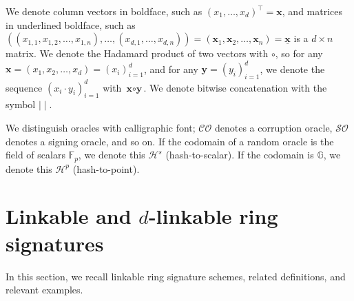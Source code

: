 \documentclass[draft]{llncs} %
\begin{document}
We denote column vectors in boldface, such as $(x_1, \ldots, x_d)^\top = \textbf{x}$, and matrices in underlined boldface, such as $((x_{1,1}, x_{1,2}, \ldots, x_{1,n}), \ldots, (x_{d,1}, \ldots, x_{d,n})) = (\textbf{x}_1, \textbf{x}_2, \ldots, \textbf{x}_n) = \underline{\textbf{x}}$ is a $d\times n$ matrix. We denote the Hadamard product of two vectors with $\circ$, so for any $\textbf{x} = (x_1, x_2, \ldots, x_d) = (x_i)_{i=1}^{d}$, and for any $\textbf{y} = (y_i)_{i=1}^{d}$, we denote the sequence $(x_i \cdot y_i)_{i=1}^{d}$ with $\textbf{x} \circ \textbf{y}$. We denote bitwise concatenation with the symbol $\mid \mid$.

We distinguish oracles with calligraphic font; $\mathcal{CO}$ denotes a corruption oracle, $\mathcal{SO}$ denotes a signing oracle, and so on. If the codomain of a random oracle is the field of scalars $\mathbb{F}_p$, we denote this $\mathcal{H}^s$ (hash-to-scalar). If the codomain is $\mathbb{G}$, we denote this $\mathcal{H}^p$ (hash-to-point).


\section{Linkable and $d$-linkable ring signatures}\label{sec:lrs}

In this section, we recall linkable ring signature schemes, related definitions, and relevant examples.
\end{document}
